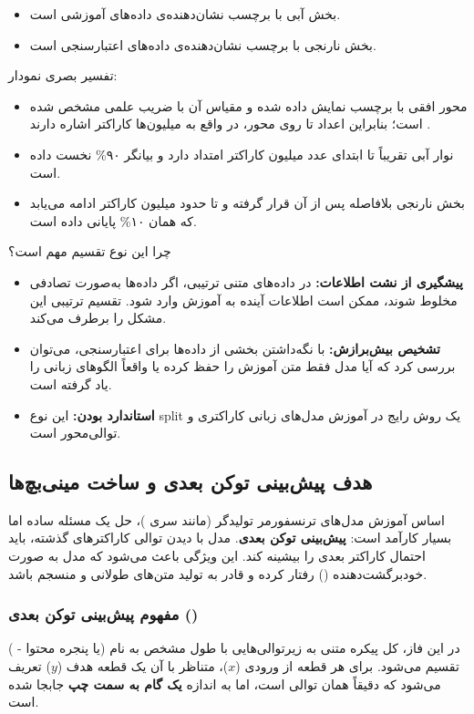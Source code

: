 \documentclass{article}
\begin{document}
\begin{itemize}
	\item بخش آبی با برچسب  نشان‌دهنده‌ی داده‌های آموزشی است.
	\item بخش نارنجی با برچسب  نشان‌دهنده‌ی داده‌های اعتبارسنجی است.
\end{itemize}

تفسیر بصری نمودار:
\begin{itemize}
	\item محور افقی با برچسب  نمایش داده شده و مقیاس آن با ضریب علمی  مشخص شده است؛ بنابراین اعداد  تا  روی محور، در واقع به میلیون‌ها کاراکتر اشاره دارند .
	\item نوار آبی تقریباً تا ابتدای عدد میلیون کاراکتر امتداد دارد و بیانگر ۹۰\% نخست داده است.
	\item بخش نارنجی بلافاصله پس از آن قرار گرفته و تا حدود  میلیون کاراکتر ادامه می‌یابد که همان ۱۰\% پایانی داده است.
\end{itemize}

چرا این نوع تقسیم مهم است؟
\begin{itemize}
	\item \textbf{پیشگیری از نشت اطلاعات:} در داده‌های متنی ترتیبی، اگر داده‌ها به‌صورت تصادفی مخلوط شوند، ممکن است اطلاعات آینده به آموزش وارد شود. تقسیم ترتیبی این مشکل را برطرف می‌کند.
	\item \textbf{تشخیص بیش‌برازش:} با نگه‌داشتن بخشی از داده‌ها برای اعتبارسنجی، می‌توان بررسی کرد که آیا مدل فقط متن آموزش را حفظ کرده یا واقعاً الگوهای زبانی را یاد گرفته است.
	\item \textbf{استاندارد بودن:} این نوع split یک روش رایج در آموزش مدل‌های زبانی کاراکتری و توالی‌محور است.
\end{itemize}

\subsection{هدف پیش‌بینی توکن بعدی و ساخت مینی‌بچ‌ها}

اساس آموزش مدل‌های ترنسفورمر تولیدگر (مانند سری )، حل یک مسئله ساده اما بسیار کارآمد است: \textbf{پیش‌بینی توکن بعدی}. مدل با دیدن توالی کاراکترهای گذشته، باید احتمال کاراکتر بعدی را بیشینه کند. این ویژگی باعث می‌شود که مدل به صورت خودبرگشت‌دهنده () رفتار کرده و قادر به تولید متن‌های طولانی و منسجم باشد.

\subsubsection*{مفهوم پیش‌بینی توکن بعدی ()}
در این فاز، کل پیکره متنی به زیرتوالی‌هایی با طول مشخص به نام  (یا پنجره محتوا - ) تقسیم می‌شود. برای هر قطعه از ورودی ($x$)، متناظر با آن یک قطعه هدف ($y$) تعریف می‌شود که دقیقاً همان توالی است، اما به اندازه \textbf{یک گام به سمت چپ} جابجا شده است.
\end{document}
